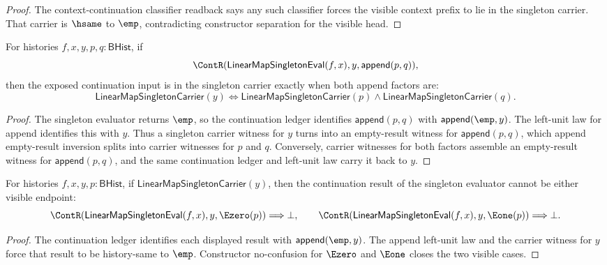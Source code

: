 \begin{proof}
The context-continuation classifier readback says any such classifier forces
the visible context prefix to lie in the singleton carrier. That carrier is
$\hsame$ to $\emp$, contradicting constructor separation for the visible head.
\end{proof}

\begin{theorem}
\label{thm:linearmap-singleton-eval-continuation-append-target-carrier}
For histories $f,x,y,p,q:\mathsf{BHist}$, if
$$
\ContR(\mathsf{LinearMapSingletonEval}(f,x),y,\mathsf{append}(p,q)),
$$
then the exposed continuation input is in the singleton carrier exactly when
both append factors are:
$$
\mathsf{LinearMapSingletonCarrier}(y)
\Longleftrightarrow
\mathsf{LinearMapSingletonCarrier}(p)\land
\mathsf{LinearMapSingletonCarrier}(q).
$$
\end{theorem}
\begin{proof}
The singleton evaluator returns $\emp$, so the continuation ledger identifies
$\mathsf{append}(p,q)$ with $\mathsf{append}(\emp,y)$. The left-unit law for
append identifies this with $y$. Thus a singleton carrier witness for $y$
turns into an empty-result witness for $\mathsf{append}(p,q)$, which append
empty-result inversion splits into carrier witnesses for $p$ and $q$.
Conversely, carrier witnesses for both factors assemble an empty-result
witness for $\mathsf{append}(p,q)$, and the same continuation ledger and
left-unit law carry it back to $y$.
\end{proof}

\begin{theorem}
\label{thm:linearmap-singleton-eval-continuation-visible-result-absurd}
For histories $f,x,y,p:\mathsf{BHist}$, if
$\mathsf{LinearMapSingletonCarrier}(y)$, then the continuation result of the
singleton evaluator cannot be either visible endpoint:
$$
\ContR(\mathsf{LinearMapSingletonEval}(f,x),y,\Ezero(p))\Longrightarrow\bot,
\qquad
\ContR(\mathsf{LinearMapSingletonEval}(f,x),y,\Eone(p))\Longrightarrow\bot.
$$
\end{theorem}
\begin{proof}
The continuation ledger identifies each displayed result with
$\mathsf{append}(\emp,y)$. The append left-unit law and the carrier witness for
$y$ force that result to be history-same to $\emp$. Constructor no-confusion
for $\Ezero$ and $\Eone$ closes the two visible cases.
\end{proof}


